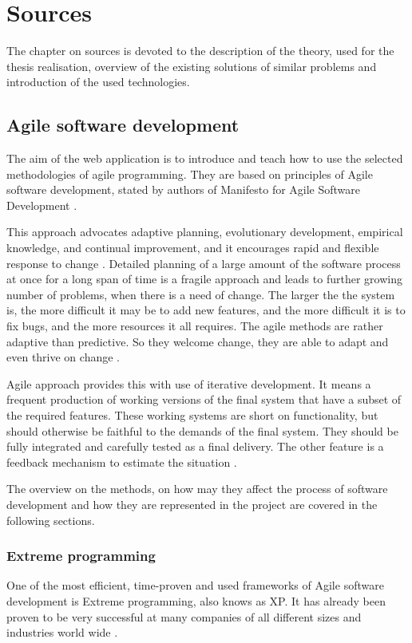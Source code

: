 \chapter{Sources}
\label{ch:sources}
The chapter on sources is devoted to the description of the theory, used for the thesis realisation, overview of the existing solutions of similar problems and introduction of the used technologies.

\section{Agile software development}
The aim of the web application is to introduce and teach how to use the selected methodologies of agile programming. They are based on principles of Agile software development, stated by authors of Manifesto for Agile Software Development \cite{manifesto}.

This approach advocates adaptive planning, evolutionary development, empirical knowledge, and continual improvement, and it encourages rapid and flexible response to change \cite{swdev}. Detailed planning of a large amount of the software process at once for a long span of time is a fragile approach and leads to further growing number of problems, when there is a need of change. The larger the the system is, the more difficult it may be to add new features, and the more difficult it is to fix bugs, and the more resources it all requires. The agile methods are rather adaptive than predictive. So they welcome change, they are able to adapt and even thrive on change \cite[From Nothing, to Monumental, to Agile]{agile_fowler}.

Agile approach provides this with use of iterative development. It means a frequent production of working versions of the final system that have a subset of the required features. These working systems are short on functionality, but should otherwise be faithful to the demands of the final system. They should be fully integrated and carefully tested as a final delivery. The other feature is a feedback mechanism to estimate the situation \cite[Controlling an Unpredictable Process - Iterations]{agile_fowler}. 

The overview on the methods, on how may they affect the process of software development and how they are represented in the project are covered in the following sections.

\subsection{Extreme programming}
One of the most efficient, time-proven and used frameworks of Agile software development is Extreme programming, also knows as XP. It has already been proven to be very successful at many companies of all different sizes and industries world wide \cite{xp_intro}.

